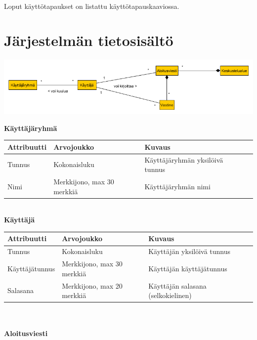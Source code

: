 \documentclass[12pt,a4paper,leqno]{report}
\begin{document}
\noindent Loput käyttötapaukset on listattu käyttötapauskaaviossa.

\chapter{Järjestelmän tietosisältö}

\begin{center}
\includegraphics[scale=0.55]{tietosisaltokaavio}
\end{center}

\renewcommand{\arraystretch}{1.5}

\noindent \textbf{Käyttäjäryhmä}

\begin{center}
\begin{tabular}{| l | l | l | l |}
\hline
\textbf{Attribuutti} & \textbf{Arvojoukko} & \textbf{Kuvaus} \\ \hline
Tunnus & Kokonaisluku & Käyttäjäryhmän yksilöivä tunnus \\ \hline
Nimi & Merkkijono, max 30 merkkiä & Käyttäjäryhmän nimi \\ \hline
\end{tabular}
\end{center}
\ \\

\noindent \textbf{Käyttäjä}

\begin{center}
\begin{tabular}{| l | l | l | l |}
\hline
\textbf{Attribuutti} & \textbf{Arvojoukko} & \textbf{Kuvaus} \\ \hline
Tunnus & Kokonaisluku & Käyttäjän yksilöivä tunnus \\ \hline
Käyttäjätunnus & Merkkijono, max 30 merkkiä & Käyttäjän käyttäjätunnus \\ \hline
Salasana & Merkkijono, max 20 merkkiä & Käyttäjän salasana (selkokielinen) \\ \hline
\end{tabular}
\end{center}
\ \\ \\

 \noindent \textbf{Aloitusviesti}
\end{document}
